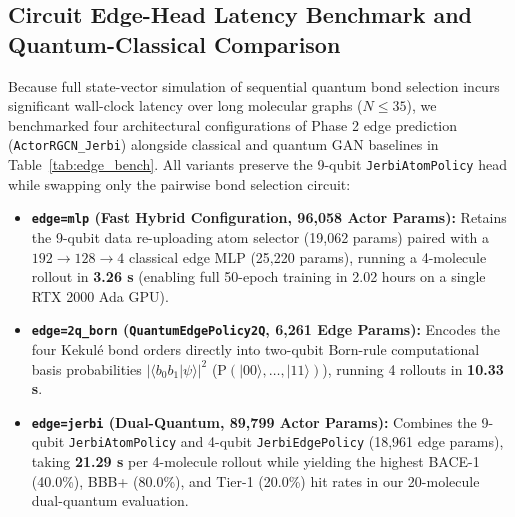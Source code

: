 \documentclass[10pt,a4paper]{article}
\begin{document}
\subsection{Circuit Edge-Head Latency Benchmark and Quantum-Classical Comparison}
Because full state-vector simulation of sequential quantum bond selection incurs significant wall-clock latency over long molecular graphs ($N \le 35$), we benchmarked four architectural configurations of Phase 2 edge prediction (\texttt{ActorRGCN\_Jerbi}) alongside classical and quantum GAN baselines in Table~\ref{tab:edge_bench}. All variants preserve the 9-qubit \texttt{JerbiAtomPolicy} head while swapping only the pairwise bond selection circuit:
\begin{itemize}[noitemsep]
    \item \textbf{\texttt{edge=mlp} (Fast Hybrid Configuration, 96,058 Actor Params):} Retains the 9-qubit data re-uploading atom selector (19,062 params) paired with a $192 \to 128 \to 4$ classical edge MLP (25,220 params), running a 4-molecule rollout in \textbf{3.26 s} (enabling full 50-epoch training in 2.02 hours on a single RTX 2000 Ada GPU).
    \item \textbf{\texttt{edge=2q\_born} (\texttt{QuantumEdgePolicy2Q}, 6,261 Edge Params):} Encodes the four Kekul\'e bond orders directly into two-qubit Born-rule computational basis probabilities $|\langle b_0 b_1|\psi\rangle|^2$ ($\mathrm{P}(|00\rangle,\dots,|11\rangle)$), running 4 rollouts in \textbf{10.33 s}.
    \item \textbf{\texttt{edge=jerbi} (Dual-Quantum, 89,799 Actor Params):} Combines the 9-qubit \texttt{JerbiAtomPolicy} and 4-qubit \texttt{JerbiEdgePolicy} (18,961 edge params), taking \textbf{21.29 s} per 4-molecule rollout while yielding the highest BACE-1 (40.0\%), BBB+ (80.0\%), and Tier-1 (20.0\%) hit rates in our 20-molecule dual-quantum evaluation.
\end{itemize}
\end{document}
